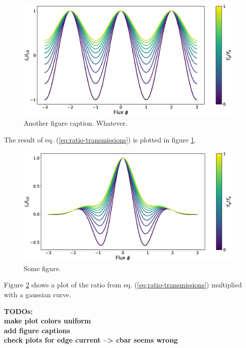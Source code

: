 \begin{figure}
\centering
\includegraphics[width=\textwidth]{figure/analyticalmodel/ratio-transmissions} 
\caption{Another figure caption. Whatever.}\label{fig:ratio-transmissions}
\end{figure}
The result of eq. (\ref{eq:ratio-transmissions}) is plotted in figure \ref{fig:ratio-transmissions}. 
\begin{figure}
\centering
\includegraphics[width=\textwidth]{figure/analyticalmodel/ratio-transmissions-gaussian}
\caption{Some figure.}\label{fig:modulated-pattern}
\end{figure}
Figure \ref{fig:modulated-pattern} shows a plot of the ratio from eq. (\ref{eq:ratio-transmissions}) multiplied with a gaussian curve. 

\textbf{TODOs: \\
make plot colors uniform\\
add figure captions\\
check plots for edge current --> cbar seems wrong}

